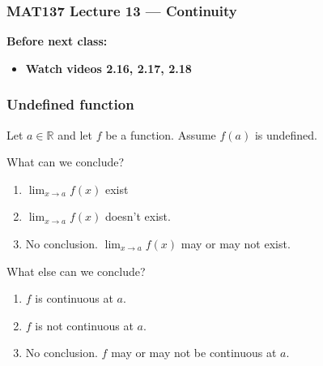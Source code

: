 \documentclass[14pt]{beamer}
\newcommand {\DS} [1] {${\displaystyle #1}$}
\newcommand {\R}{\mathbb{R}}
\newcommand{\setsize}[1]{\fontsize{#1}{#1}\selectfont} %
\newcommand{\smallerfont}{\setsize{13}} %
\begin{document}
\begin{frame}
\frametitle{MAT137 Lecture 13 --- Continuity}
	{\bf Before next class:}
		\begin{itemize} \normalsize
			\item {\bf Watch videos 2.16, 2.17, 2.18 }
		\end{itemize}
	\vfill

\end{frame}

\begin{frame}[t]
	\frametitle{Undefined function}
	\smallerfont
	Let $a \in \R$ and let $f$ be a function.   Assume $f(a)$ is undefined.

	\vfill

	\begin{block}{What can we conclude?}
		\begin{enumerate}
			\item  \DS{\lim_{x \to a} f(x)} exist
			\item  \DS{\lim_{x \to a} f(x)} doesn't exist.
			\item   No conclusion.  \DS{\lim_{x \to a} f(x)} may or may not exist.
		\end{enumerate}
	\end{block}

	\vfill

	\begin{block}{What else can we conclude?}
		\begin{enumerate} \addtocounter{enumi}{3}
			\item  $f$ is continuous at $a$.
			\item  $f$ is not continuous at $a$.
			\item  No conclusion. $f$ may or may not be continuous at $a$.
		\end{enumerate}
	\end{block}

	\vfill
	
\end{frame}
\end{document}

